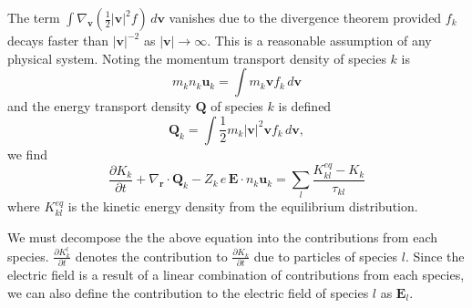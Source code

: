\documentclass{article}
\begin{document}
The term $\int\nabla_\mathbf{v}\left(\frac{1}{2}|\mathbf{v}|^2f\right)\,d\mathbf{v}$ vanishes due to the divergence theorem provided $f_k$ decays faster than $|\mathbf{v}|^{-2}$ as $|\mathbf{v}|\to\infty$. This is a reasonable assumption of any physical system. Noting the momentum transport density of species $k$ is
\[
 m_kn_k\mathbf{u}_k=\int m_k\mathbf{v}f_k\,d\mathbf{v}
\]and the energy transport density $\mathbf{Q}$ of species $k$ is defined
\begin{equation*}
\mathbf{Q}_k = \int\frac{1}{2}m_k|\mathbf{v}|^2\mathbf{v}f_k\,d\mathbf{v},
\end{equation*}
we find
\begin{equation}
\frac{\partial K_k}{\partial t} + \nabla_\mathbf{r}\cdot\mathbf{Q}_k - Z_k\,e\,\mathbf{E}\cdot n_k\mathbf{u}_k = \sum_l\frac{K_{kl}^{eq} - K_k}{\tau_{kl}}
\label{eq:KE}
\end{equation}
where $K_{kl}^{eq}$ is the kinetic energy density from the equilibrium distribution.

We must decompose the the above equation into the contributions from each species. $\frac{\partial K_k^l}{\partial t}$ denotes the contribution to $\frac{\partial K_k}{\partial t}$ due to particles of species $l$. Since the electric field is a result of a linear combination of contributions from each species, we can also define the contribution to the electric field of species $l$ as $\mathbf{E}_l$. 
\end{document}
